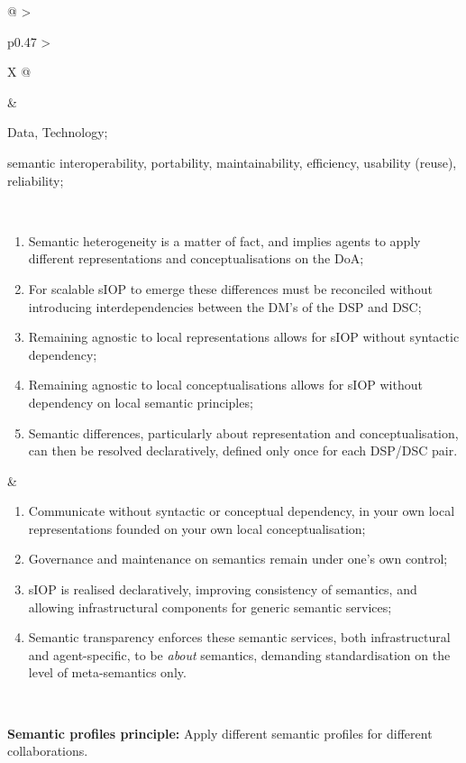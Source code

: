 \begin{xltabular}[l]{\linewidth}{@{} >{\small\raggedright\arraybackslash}p{0.47\linewidth} >{\small\raggedright\arraybackslash}X @{}}
&
\begin{description}[labelwidth=3.7cm,leftmargin=3.7cm+1ex,nosep,topsep=2ex,labelsep=1ex,font=\bfseries]
\item[Type of information:] Data, Technology;
\item[Quality attributes:] semantic interoperability, portability, maintainability, efficiency, usability (reuse), reliability;
\end{description}
\\
\begin{enumerate}[left=6pt, nosep]
  \item Semantic heterogeneity is a matter of fact, and implies agents to apply different representations and conceptualisations on the DoA;
  \item For scalable sIOP to emerge these differences must be reconciled without introducing interdependencies between the DM's of the DSP and DSC;
  \item Remaining agnostic to local representations allows for sIOP without syntactic dependency;
  \item Remaining agnostic to local conceptualisations allows for sIOP without dependency on local semantic principles;
  \item Semantic differences, particularly about representation and conceptualisation, can then be resolved declaratively, defined only once for each DSP/DSC pair.
\end{enumerate}
&
\begin{enumerate}[left=10pt, nosep]
  \item Communicate without syntactic or conceptual dependency, in your own local representations founded on your own local conceptualisation;
  \item Governance and maintenance on semantics remain under one's own control;
  \item sIOP is realised declaratively, improving consistency of semantics, and allowing infrastructural components for generic semantic services;
  \item Semantic transparency enforces these semantic services, both infrastructural and agent-specific, to be \emph{about} semantics, demanding standardisation on the level of meta-semantics only.
\end{enumerate} \\
%
%
%
\begin{mmdp}\label{dp:sprof}{\bfseries Semantic profiles principle:}
\quad Apply different semantic profiles for different collaborations. \end{mmdp}

\end{xltabular}
